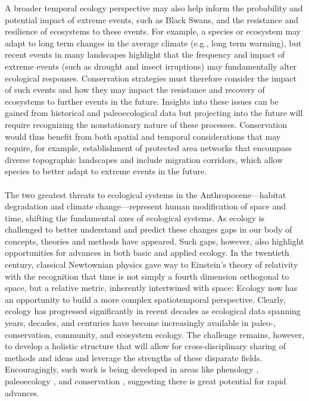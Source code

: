 \documentclass[11pt,a4paper,oneside]{article}
\begin{document}
A broader temporal ecology perspective may also help inform the probability and potential impact of extreme events, such as Black Swans, and the resistance and resilience of ecosystems to these events. For example, a species or ecosystem may adapt to long term changes in the average climate (e.g., long term warming), but recent events in many landscapes \citep[e.g.,][]{Anderegg2013} highlight that the frequency and impact of extreme events (such as drought and insect irruptions) may fundamentally alter ecological responses. Conservation strategies must therefore consider the impact of such events and how they may impact the resistance and recovery of ecosystems to further events in the future. Insights into these issues can be gained from historical and paleoecological data but projecting into the future will require recognizing the nonstationary nature of these processes. Conservation would thus benefit from both spatial and temporal considerations that may require, for example, establishment of protected area networks that encompass diverse topographic landscapes and include migration corridors, which allow species to better adapt to extreme events in the future. \\

\\

\noindent The two greatest threats to ecological systems in the Anthropocene---habitat degradation and climate change---represent human modification of space and time, shifting the fundamental axes of ecological systems. As ecology is challenged to better understand and predict these changes gaps in our body of concepts, theories and methods have appeared. Such gaps, however, also highlight opportunities for advances in both basic and applied ecology. In the twentieth century, classical Newtownian physics gave way to Einstein's theory of relativity with the recognition that time is not simply a fourth dimension orthogonal to space, but a relative metric, inherently intertwined with space: Ecology now has an opportunity to build a more complex spatiotemporal perspective. Clearly, ecology has progressed significantly in recent decades as ecological data spanning years, decades, and centuries have become increasingly available in paleo-, conservation, community, and ecosystem ecology. The challenge remains, however, to develop a holistic structure that will allow for cross-disciplinary sharing of methods and ideas and leverage the strengths of these disparate fields. Encouragingly, such work is being developed in areas like phenology \citep{Pau:2011wd}, paleoecology \citep{Brewer2012}, and conservation \citep{mooers2008}, suggesting there is great potential for rapid advances. \\
\end{document}
